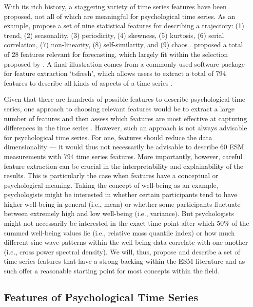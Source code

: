 \documentclass[man, 12pt, a4paper, mask, floatsintext]{apa7}
\theoremstyle{break}
\theoremstyle{plain}
\begin{document}
With its rich history, a staggering variety of time series features have been proposed, not all of which are meaningful for psychological time series. As an example, \citet{wang2006} propose a set of nine statistical features for describing a trajectory: (1) trend, (2) seasonality, (3) periodicity, (4) skewness, (5) kurtosis, (6) serial correlation, (7) non-linearity, (8) self-similarity, and (9) chaos \citep[also see][]{fulcher2013}. \citet{adya2001} proposed a total of 28 features relevant for forecasting, which largely fit within the selection proposed by \citet{wang2006}. A final illustration comes from a commonly used software package for feature extraction `tsfresh', which allows users to extract a total of 794 features to describe all kinds of aspects of a time series \citep[][]{christ2018}. 

Given that there are hundreds of possible features to describe psychological time series, one approach to choosing relevant features would be to extract a large number of features and then assess which features are most effective at capturing differences in the time series \citep[e.g.,][]{christ2018}. However, such an approach is not always advisable for psychological time series. For one, features should reduce the data dimensionality --- it would thus not necessarily be advisable to describe 60 ESM measurements with 794 time series features. More importantly, however, careful feature extraction can be crucial in the interpretability and explainability of the results. This is particularly the case when features have a conceptual or psychological meaning. Taking the concept of well-being as an example, psychologists might be interested in whether certain participants tend to have higher well-being in general (i.e., mean) or whether some participants fluctuate between extremely high and low well-being (i.e., variance). But psychologists might not necessarily be interested in the exact time point after which 50\% of the summed well-being values lie (i.e., relative mass quantile index) or how much different sine wave patterns within the well-being data correlate with one another (i.e., cross power spectral density). We will, thus, propose and describe a set of time series features that have a strong backing within the ESM literature and as such offer a reasonable starting point for most concepts within the field.

\subsection{Features of Psychological Time Series}
\end{document}
